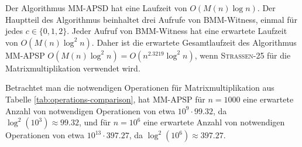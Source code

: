 \documentclass{scrartcl}
\numberwithin{equation}{section}
\begin{document}
Der Algorithmus MM-APSD hat eine Laufzeit von $O(M(n) \log n)$. Der Hauptteil des Algorithmus beinhaltet drei Aufrufe von BMM-Witness, einmal für jedes $c \in \{0, 1, 2\}$. Jeder Aufruf von BMM-Witness hat eine erwartete Laufzeit von $O(M(n) \log^2 n)$. Daher ist die erwartete Gesamtlaufzeit des Algorithmus MM-APSP $O(M(n) \log^2 n) = O(n^{2.3219} \log^2 n)$, wenn \textsc{Strassen-25} für die Matrixmultiplikation verwendet wird.

Betrachtet man die notwendigen Operationen für Matrixmultiplikation aus Tabelle \ref{tab:operations-comparison}, hat MM-APSP für $n = 1000$ eine erwartete Anzahl von notwendigen Operationen von etwa $10^9 \cdot 99.32$, da $\log^2(10^3) \approx 99.32$, und für $n = 10^6$ eine erwartete Anzahl von notwendigen Operationen von etwa $10^{13} \cdot 397.27$, da $\log^2(10^{6}) \approx 397.27$.
\end{document}
